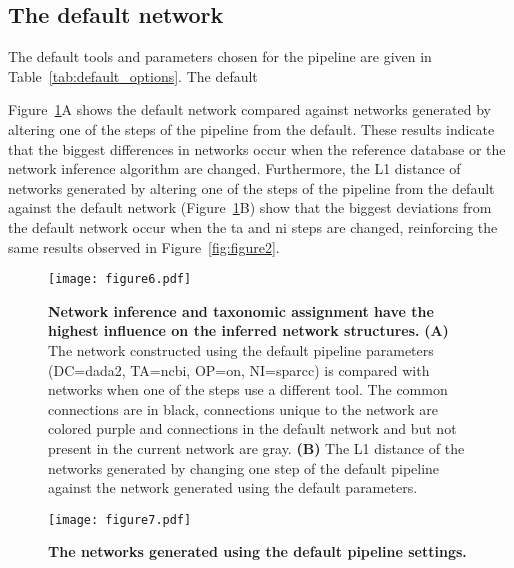   \FloatBarrier

  \subsection*{The default network}

  The default tools and parameters chosen for the pipeline are given in Table~\ref{tab:default_options}.
  The default

  Figure~\ref{fig:figure6}A shows the default network compared against networks generated by altering one of the steps of the pipeline from the default.
  These results indicate that the biggest differences in networks occur when the reference database or the network inference algorithm are changed.
  Furthermore, the L1 distance of networks generated by altering one of the steps of the pipeline from the default against the default network (Figure~\ref{fig:figure6}B) show that the biggest deviations from the default network occur when the \ac{ta} and \ac{ni} steps are changed, reinforcing the same results observed in Figure~\ref{fig:figure2}.

  \begin{figure}[h]
    \centering
    \texttt{[image: figure6.pdf]}
    \caption{
      \textbf{Network inference and taxonomic assignment have the highest influence on the inferred network structures.}
      \textbf{(A)} The network constructed using the default pipeline parameters (DC=\ac{dada2}, TA=\ac{ncbi}, OP=on, NI=\ac{sparcc}) is compared with networks when one of the steps use a different tool.
      The common connections are in black, connections unique to the network are colored purple and connections in the default network and but not present in the current network are gray.
      \textbf{(B)} The L1 distance of the networks generated by changing one step of the default pipeline against the network generated using the default parameters.
    }
    \label{fig:figure6}
  \end{figure}


  \begin{figure}[h]
    \centering
    \texttt{[image: figure7.pdf]}
    \caption{
      \textbf{The networks generated using the default pipeline settings.}
  }
    \label{fig:figure7}
  \end{figure}
